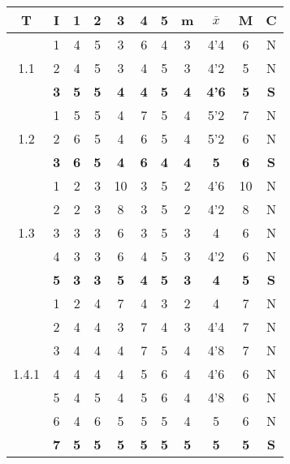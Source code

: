 \documentclass[11pt,a4paper,spanish,twoside]{report}
\begin{document}
\begin{table}[!h]
\centering
  \begin{tabular}{|c|c||c|c|c|c|c||c|c|c||c|}
    \hline
    \textbf{T} & \textbf{I} & \textbf{1} &
    \textbf{2} & \textbf{3} & \textbf{4} & \textbf{5} & \textbf{m}
    &\textbf{$\bar{x}$} &\textbf{M} & \textbf{C}\\
    \hline \hline

    \multirow{3}{*}{1.1} 
    & 1 & 4 & 5 & 3 & 6 & 4 & 3 & 4'4 & 6 & N \\
    & 2 & 4 & 5 & 3 & 4 & 5 & 3 & 4'2 & 5 & N \\
    &\textbf{3} &\textbf {5} &\textbf {5} &\textbf {4} &\textbf {4}
    &\textbf{5} & \textbf{4} & \textbf{4'6} &\textbf{5} & \textbf{S}\\
    \hline

    \multirow{3}{*}{1.2} 
    & 1 & 5 & 5 & 4 & 7 & 5 & 4 & 5'2 & 7 & N \\
    & 2 & 6 & 5 & 4 & 6 & 5 & 4 & 5'2 & 6 & N \\
    &\textbf{3} & \textbf{6} & \textbf{5} & \textbf{4} & \textbf{6} &
    \textbf{4} & \textbf{4} & \textbf{5} & \textbf{6} & \textbf{S} \\    
    \hline

    \multirow{5}{*}{1.3} 
    & 1 & 2 & 3 & 10 & 3 & 5 & 2 & 4'6 & 10 & N \\
    & 2 & 2 & 3 & 8  & 3 & 5 & 2 & 4'2 & 8  & N \\
    & 3 & 3 & 3 & 6  & 3 & 5 & 3 & 4   & 6  & N \\
    & 4 & 3 & 3 & 6  & 4 & 5 & 3 & 4'2 & 6  & N \\
    & \textbf{5} & \textbf{3} & \textbf{3} & \textbf{5} & \textbf{4} &
    \textbf{5} & \textbf{3} & \textbf{4} & \textbf{5} & \textbf{S} \\
    \hline

    \multirow{7}{*}{1.4.1} 
    & 1 & 2 & 4 & 7 & 4 & 3 & 2 & 4   & 7 & N \\
    & 2 & 4 & 4 & 3 & 7 & 4 & 3 & 4'4 & 7 & N \\
    & 3 & 4 & 4 & 4 & 7 & 5 & 4 & 4'8 & 7 & N \\
    & 4 & 4 & 4 & 4 & 5 & 6 & 4 & 4'6 & 6 & N \\
    & 5 & 4 & 5 & 4 & 5 & 6 & 4 & 4'8 & 6 & N \\
    & 6 & 4 & 6 & 5 & 5 & 5 & 4 & 5   & 6 & N \\
    & \textbf{7} & \textbf{5} & \textbf{5} & \textbf{5} & \textbf{5} &
    \textbf{5} & \textbf{5} & \textbf{5} & \textbf{5} & \textbf{S} \\
    \hline


\end{tabular}
\end{table}
\end{document}
